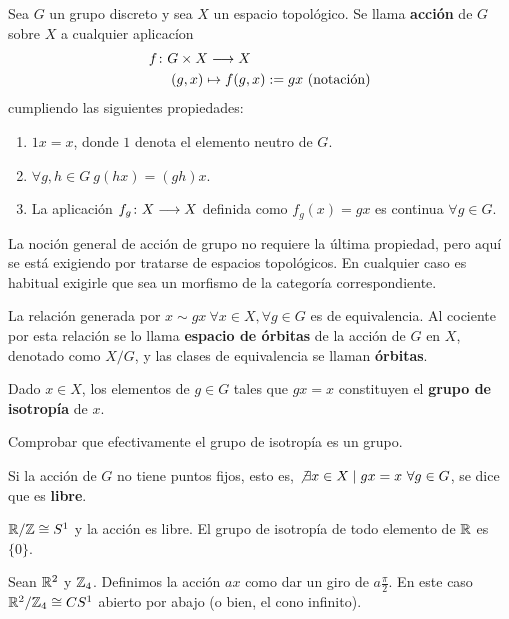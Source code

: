 \documentclass[GTS.tex]{subfiles}
\begin{document}
\begin{defi} Sea $G$ un grupo discreto y sea $X$ un espacio topológico. Se llama \textbf{acción} de $G$ sobre $X$ a cualquier aplicacíon 
\begin{align*}
f&\colon{G\times X}\longrightarrow{X}\\
&\quad (g,x)\mapsto f(g,x):=gx\ \text{(notaci\'on)}
\end{align*}
cumpliendo las siguientes propiedades:
\begin{enumerate}
\item $1x=x$, donde $1$ denota el elemento neutro de $G$.
\item $\forall g,h\in G\ g(hx)=(gh)x$.
\item La aplicación $f_g\colon{X}\longrightarrow{X}$ definida como $f_g(x)=gx$ es continua $\forall g\in G$. 
\end{enumerate}

\end{defi}

\begin{nota}
La noción general de acción de grupo no requiere la última propiedad, pero aquí se está exigiendo por tratarse de espacios topológicos. En cualquier caso es habitual exigirle que sea un morfismo de la categoría correspondiente.
\end{nota}

\begin{prop}
La relación generada por $x\sim gx\ \forall x\in X, \forall g\in G$ es de equivalencia. Al cociente por esta relación se lo llama \textbf{espacio de órbitas} de la acción de $G$ en $X$, denotado como $X/G$, y las clases de equivalencia se llaman \textbf{órbitas}.
\end{prop}

\begin{defi} Dado $x\in X$, los elementos de $g\in G$ tales que $gx=x$ constituyen el \textbf{grupo de isotropía} de $x$.
\end{defi}
\begin{ejer} Comprobar que efectivamente el grupo de isotropía es un grupo.
\end{ejer}

\begin{defi} Si la acción de $G$ no tiene puntos fijos, esto es, $\not\exists x\in X\mid gx=x\ \forall g\in G$, se dice que es \textbf{libre}.
\end{defi}

\begin{ej} $\mathbb{R}/\mathbb{Z}\cong S^1$ y la acción es libre. El grupo de isotropía de todo elemento de $\mathbb{R}$ es $\{0\}$.
\end{ej}

\begin{ej} Sean $\mathbb{R}^2$ y $\mathbb{Z}_4$. Definimos la acción $ax$ como dar un giro de $a\frac{\pi}{2}$. En este caso $\mathbb{R}^2/\mathbb{Z}_4\cong CS^1$ abierto por abajo (o bien, el cono infinito).
\end{ej}
\end{document}
